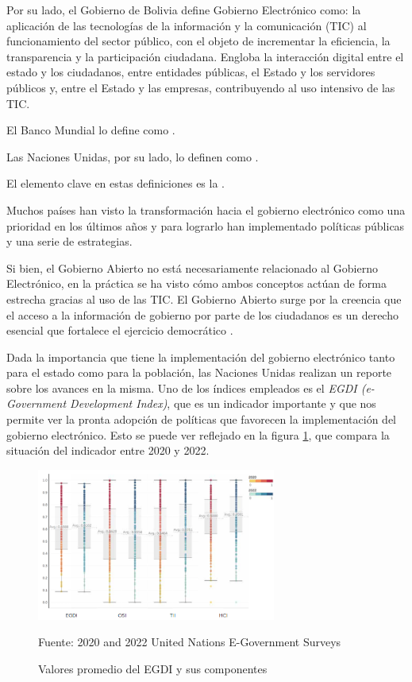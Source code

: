 Por su lado, el Gobierno de Bolivia define Gobierno Electrónico como: la aplicación de las tecnologías de la información y la comunicación (TIC) al funcionamiento del sector público, con el objeto de incrementar la eficiencia, la transparencia y la participación ciudadana.
Engloba la interacción digital entre el estado y los ciudadanos, entre entidades públicas, el Estado y los servidores públicos y, entre el Estado y las empresas, contribuyendo al uso intensivo de las TIC.

El Banco Mundial lo define como .

Las Naciones Unidas, por su lado, lo definen como .

El elemento clave en estas definiciones es la .

Muchos países han visto la transformación hacia el gobierno electrónico como una prioridad en los últimos años y para lograrlo han implementado políticas públicas y una serie de estrategias.

Si bien, el Gobierno Abierto no está necesariamente relacionado al Gobierno Electrónico, en la práctica se ha visto cómo ambos conceptos actúan de forma estrecha gracias al uso de las TIC. El Gobierno Abierto surge por la creencia que el acceso a la información de gobierno por parte de los ciudadanos es un derecho esencial que fortalece el ejercicio democrático \cite[13]{naserGobiernoElectronicoGestion2011}.

Dada la importancia que tiene la implementación del gobierno electrónico tanto para el estado como para la población, las Naciones Unidas realizan un reporte sobre los avances en la misma. Uno de los índices empleados es el \textit{EGDI (e-Government Development Index)}, que es un indicador importante y que nos permite ver la pronta adopción de políticas que favorecen la implementación del gobierno electrónico. Esto se puede ver reflejado en la figura \ref{fig:egdi2020_2022}, que compara la situación del indicador entre 2020 y 2022.

\begin{figure}[!h]
    \centering
    \includegraphics[width=0.7\textwidth]{assets/egdi2020_2022}
    \caption{Valores promedio del EGDI y sus componentes}{Fuente: 2020 and 2022 United Nations E-Government Surveys}
    \label{fig:egdi2020_2022}
\end{figure}

